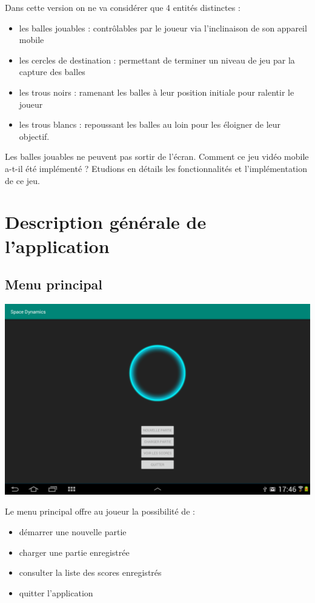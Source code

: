 \documentclass{article}
\begin{document}
Dans cette version on ne va considérer que 4 entités distinctes :
\begin{itemize}
\item les balles jouables : contrôlables par le joueur via l’inclinaison de son appareil mobile
\item les cercles de destination : permettant de terminer un niveau de jeu par la capture des balles
\item les trous noirs : ramenant les balles à leur position initiale pour ralentir le joueur
\item les trous blancs : repoussant les balles au loin pour les éloigner de leur objectif.
\end{itemize}

Les balles jouables ne peuvent pas sortir de l’écran.
\bigbreak
Comment ce jeu vidéo mobile a-t-il été implémenté ?
\bigbreak
Etudions en détails les fonctionnalités et l’implémentation de ce jeu.



\section{Description générale de l'application}

\subsection{Menu principal}
\begin{center}
\includegraphics[scale=0.25]{MainMenuActivity.png}
\end{center}
Le menu principal offre au joueur la possibilité de :
\begin{itemize}
\item démarrer une nouvelle partie
\item charger une partie enregistrée
\item consulter la liste des scores enregistrés
\item quitter l'application
\end{itemize}
\end{document}

